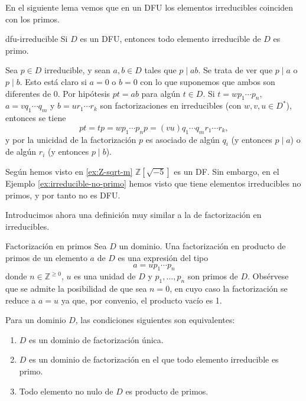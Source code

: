 En el siguiente lema vemos que en un DFU los elementos irreducibles coinciden con los primos.

\begin{lemma}{}{dfu-irreducible}
Si \(D\) es un DFU, entonces todo elemento irreducible de \(D\) es primo.
\end{lemma}

\begin{proofbox}
Sea \(p \in D\) irreducible, y sean \(a, b \in D\) tales que \(p \mid ab\). Se trata de ver que \(p \mid a\) o \(p \mid b\). Esto está claro si \(a = 0\) o \(b = 0\) con lo que suponemos que ambos son diferentes de 0. Por hipótesis \(pt = ab\) para algún \(t \in D\). Si \(t = w p_1 \cdots p_n\), \(a = v q_1 \cdots q_m\) y \(b = u r_1 \cdots r_k\) son factorizaciones en irreducibles (con \(w, v, u \in D^*\)), entonces se tiene
\[
pt = tp = w p_1 \cdots p_n p  = (vu) q_1 \cdots q_m r_1 \cdots r_k,
\]
y por la unicidad de la factorización \(p\) es asociado de algún \(q_i\) (y entonces \(p \mid a\)) o de algún \(r_i\) (y entonces \(p \mid b\)).
\end{proofbox}

Según hemos visto en \ref{ex:Z-sqrt-m} \(\mathbb{Z}[\sqrt{-5}]\) es un DF. Sin embargo, en el Ejemplo \ref{ex:irreducible-no-primo} hemos visto que tiene elementos irreducibles no primos, y por tanto no es DFU.

Introducimos ahora una definición muy similar a la de factorización en irreducibles.
\begin{definition}{Factorización en primos}{}
Sea \(D\) un dominio. Una factorización en producto de primos de un elemento \(a\) de \(D\) es una expresión del tipo
\[
a = u p_1 \cdots p_n
\]
donde \(n \in \mathbb{Z}^{\geq 0}\), \(u\) es una unidad de \(D\) y \(p_1, \ldots, p_n\) son primos de \(D\). Obsérvese que se admite la posibilidad de que sea $n = 0$, en cuyo caso la factorización se reduce a $a = u$ ya que, por convenio, el producto vacío es 1.
\end{definition}

\begin{proposition}{}{}
Para un dominio \(D\), las condiciones siguientes son equivalentes:

\begin{enumerate}
\item \(D\) es un dominio de factorización única.

\item \(D\) es un dominio de factorización en el que todo elemento irreducible es primo.

\item Todo elemento no nulo de \(D\) es producto de primos.
\end{enumerate}

\end{proposition}

